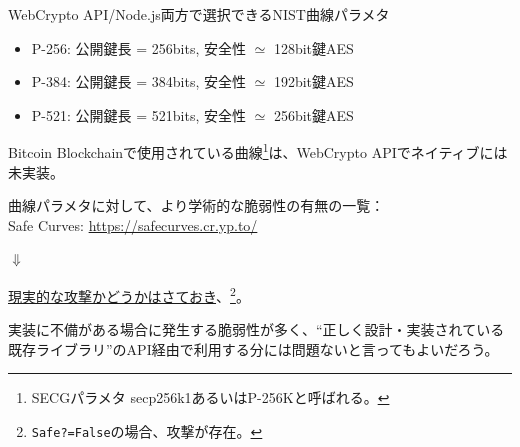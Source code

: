 \documentclass[12pt,dvipdfmx]{beamer}
\newcommand{\backupbegin}{
   \newcounter{framenumberappendix}
   \setcounter{framenumberappendix}{\value{framenumber}}
}
\newcommand{\backupend}{
   \addtocounter{framenumberappendix}{-\value{framenumber}}
   \addtocounter{framenumber}{\value{framenumberappendix}} 
}
\begin{document}
\begin{frame}
\begin{block}{\small WebCrypto API/Node.js両方で選択できるNIST曲線パラメタ}
\begin{itemize}
 \item P-256: 公開鍵長 = 256bits, 安全性 $\simeq$ 128bit鍵AES
 \item P-384: 公開鍵長 = 384bits, 安全性 $\simeq$ 192bit鍵AES
 \item P-521: 公開鍵長 = 521bits, 安全性 $\simeq$ 256bit鍵AES
\end{itemize}
\end{block}
Bitcoin Blockchainで使用されている曲線\footnote[frame]{\scriptsize SECGパラメタ secp256k1あるいはP-256Kと呼ばれる。}は、WebCrypto APIでネイティブには未実装。
\end{frame}

\begin{frame}

曲線パラメタに対して、より学術的な脆弱性の有無の一覧：\\
Safe Curves: \url{https://safecurves.cr.yp.to/}

\begin{center}
 $\Downarrow$
\end{center}

\underline{現実的な攻撃かどうかはさておき}、\footnote{\scriptsize \texttt{Safe?=False}の場合、攻撃が存在。}。

実装に不備がある場合に発生する脆弱性が多く、\alert{``正しく設計・実装されている既存ライブラリ''のAPI経由で利用する分には問題ない}と言ってもよいだろう。
\end{frame}







 

\end{document}

